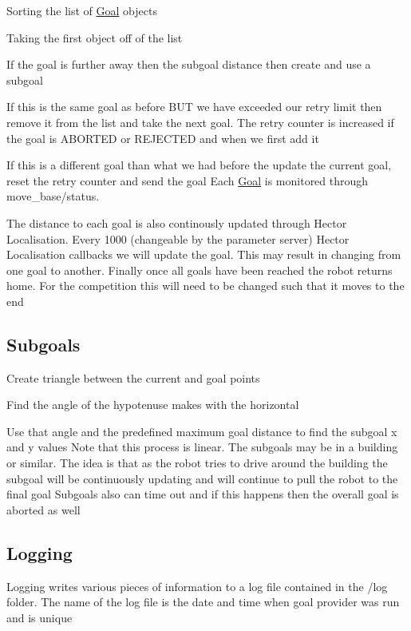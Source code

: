 \begin{DoxyItemize}
\item \-Sorting the list of \hyperlink{classGoal}{\-Goal} objects
\item \-Taking the first object off of the list
\item \-If the goal is further away then the subgoal distance then create and use a subgoal
\item \-If this is the same goal as before \-B\-U\-T we have exceeded our retry limit then remove it from the list and take the next goal. \-The retry counter is increased if the goal is \-A\-B\-O\-R\-T\-E\-D or \-R\-E\-J\-E\-C\-T\-E\-D and when we first add it
\item \-If this is a different goal than what we had before the update the current goal, reset the retry counter and send the goal \-Each \hyperlink{classGoal}{\-Goal} is monitored through move\-\_\-base/status. \par

\end{DoxyItemize}

\-The distance to each goal is also continously updated through \-Hector \-Localisation. \-Every 1000 (changeable by the parameter server) \-Hector \-Localisation callbacks we will update the goal. \-This may result in changing from one goal to another. \-Finally once all goals have been reached the robot returns home. \-For the competition this will need to be changed such that it moves to the end\hypertarget{index_subgoal}{}\subsection{\-Subgoals}\label{index_subgoal}

\begin{DoxyItemize}
\item \-Create triangle between the current and goal points
\item \-Find the angle of the hypotenuse makes with the horizontal
\item \-Use that angle and the predefined maximum goal distance to find the subgoal x and y values \-Note that this process is linear. \-The subgoals may be in a building or similar. \-The idea is that as the robot tries to drive around the building the subgoal will be continuously updating and will continue to pull the robot to the final goal \-Subgoals also can time out and if this happens then the overall goal is aborted as well
\end{DoxyItemize}\hypertarget{index_logging}{}\subsection{\-Logging}\label{index_logging}
\-Logging writes various pieces of information to a log file contained in the /log folder. \-The name of the log file is the date and time when goal provider was run and is unique 